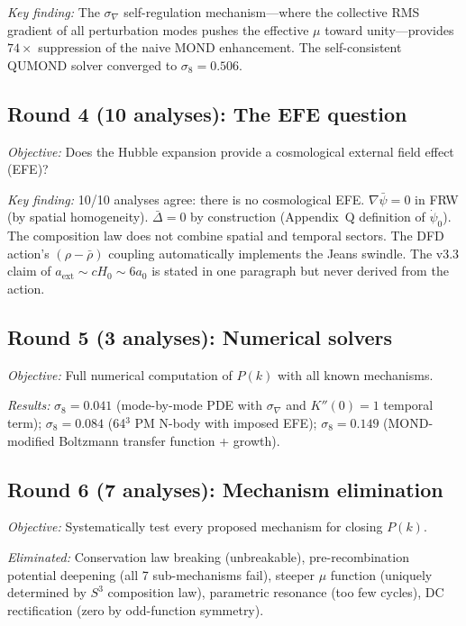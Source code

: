 \documentclass[aps,prd,twocolumn,superscriptaddress,nofootinbib]{revtex4-2}
\newcommand{\Sph}{S}
\begin{document}
\emph{Key finding:} The $\sigma_\nabla$ self-regulation
mechanism---where the collective RMS gradient of all
perturbation modes pushes the effective $\mu$ toward
unity---provides $74\times$ suppression of the naive
MOND enhancement. The self-consistent QUMOND solver
converged to $\sigma_8 = 0.506$.

\subsection{Round 4 (10 analyses): The EFE question}

\emph{Objective:} Does the Hubble expansion provide a
cosmological external field effect (EFE)?

\emph{Key finding:} 10/10 analyses agree: there is no
cosmological EFE. $\nabla\bar\psi = 0$ in FRW (by
spatial homogeneity). $\bar\Delta = 0$ by construction
(Appendix~Q definition of $\dot\psi_0$). The composition
law does not combine spatial and temporal sectors. The
DFD action's $({\rho-\bar\rho})$ coupling automatically
implements the Jeans swindle. The v3.3 claim of
$a_{\mathrm{ext}}\sim cH_0\sim 6a_0$ is stated in one
paragraph but never derived from the action.

\subsection{Round 5 (3 analyses): Numerical solvers}

\emph{Objective:} Full numerical computation of $P(k)$
with all known mechanisms.

\emph{Results:}
$\sigma_8 = 0.041$ (mode-by-mode PDE with $\sigma_\nabla$
and $K''(0)=1$ temporal term);
$\sigma_8 = 0.084$ (64$^3$ PM N-body with imposed EFE);
$\sigma_8 = 0.149$ (MOND-modified Boltzmann transfer
function + growth).

\subsection{Round 6 (7 analyses): Mechanism elimination}

\emph{Objective:} Systematically test every proposed
mechanism for closing $P(k)$.

\emph{Eliminated:} Conservation law breaking (unbreakable),
pre-recombination potential deepening (all 7 sub-mechanisms
fail), steeper $\mu$ function (uniquely determined by
$\Sph^3$ composition law), parametric resonance (too few
cycles), DC rectification (zero by odd-function symmetry).
\end{document}
